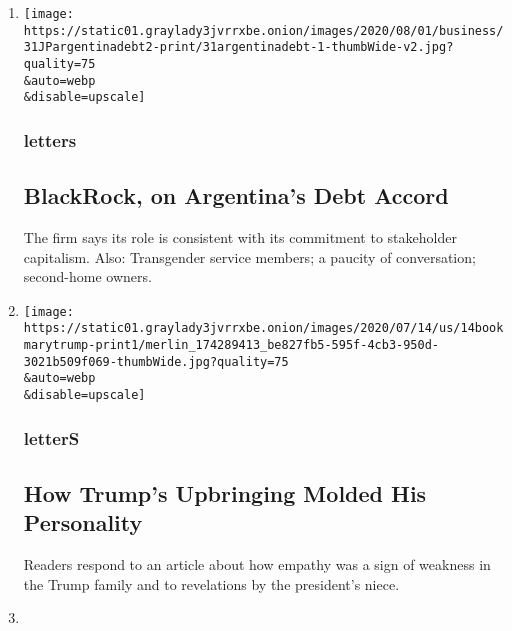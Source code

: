 \begin{enumerate}
\def\labelenumi{\arabic{enumi}.}
\item
  \href{/2020/08/04/opinion/letters/blackrock-argentina.html}{}

  \texttt{[image: https://static01.graylady3jvrrxbe.onion/images/2020/08/01/business/31JPargentinadebt2-print/31argentinadebt-1-thumbWide-v2.jpg?quality=75\\\&auto=webp\\\&disable=upscale]}

  \hypertarget{letters}{%
  \subsubsection{letters}\label{letters}}

  \hypertarget{blackrock-on-argentinas-debt-accord}{%
  \subsection{BlackRock, on Argentina's Debt
  Accord}\label{blackrock-on-argentinas-debt-accord}}

  The firm says its role is consistent with its commitment to
  stakeholder capitalism. Also: Transgender service members; a paucity
  of conversation; second-home owners.
\item
  \href{/2020/08/04/opinion/letters/trump-family.html}{}

  \texttt{[image: https://static01.graylady3jvrrxbe.onion/images/2020/07/14/us/14bookmarytrump-print1/merlin\_174289413\_be827fb5-595f-4cb3-950d-3021b509f069-thumbWide.jpg?quality=75\\\&auto=webp\\\&disable=upscale]}

  \hypertarget{letters-1}{%
  \subsubsection{letterS}\label{letters-1}}

  \hypertarget{how-trumps-upbringing-molded-his-personality}{%
  \subsection{How Trump's Upbringing Molded His
  Personality}\label{how-trumps-upbringing-molded-his-personality}}

  Readers respond to an article about how empathy was a sign of weakness
  in the Trump family and to revelations by the president's niece.
\item
  \href{/2020/08/03/opinion/letters/nuclear-arms-treaty.html}{}


\end{enumerate}

